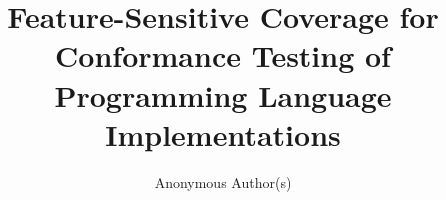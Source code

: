 \documentclass[acmsmall,review,screen]{acmart}
\begin{document}
\title[Feature-Sensitive Coverage for Conformance Testing]
{Feature-Sensitive Coverage for Conformance Testing of Programming Language
Implementations}

\author{Anonymous Author(s)}

%
%
%
\end{document}
